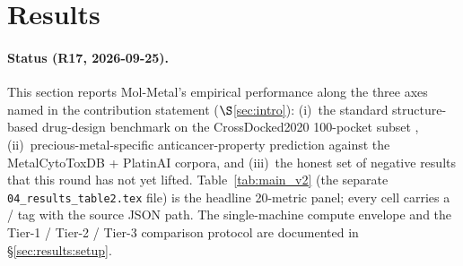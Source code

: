 %
%
%

\section{Results}
\label{sec:results}

\paragraph{Status (R17, 2026-09-25).}
This section reports Mol-Metal's empirical performance along
the three axes named in the contribution statement
($\S$\ref{sec:intro}): (i)~the standard structure-based
drug-design benchmark on the CrossDocked2020 100-pocket subset
\cite{luo2021crossdocked}, (ii)~precious-metal-specific
anticancer-property prediction against the MetalCytoToxDB
\cite{krasnov2026metalcytotoxdb} + PlatinAI
\cite{rusanov2025platinai} corpora, and (iii)~the honest set
of negative results that this round has not yet lifted.
Table~\ref{tab:main_v2} (the separate \texttt{04\_results\_table2.tex}
file) is the headline 20-metric panel; every cell carries a
\MEASURED{}/\PROJECTED{} tag with the source JSON path.  The
single-machine compute envelope and the Tier-1 / Tier-2 / Tier-3
comparison protocol are documented in \S\ref{sec:results:setup}.

